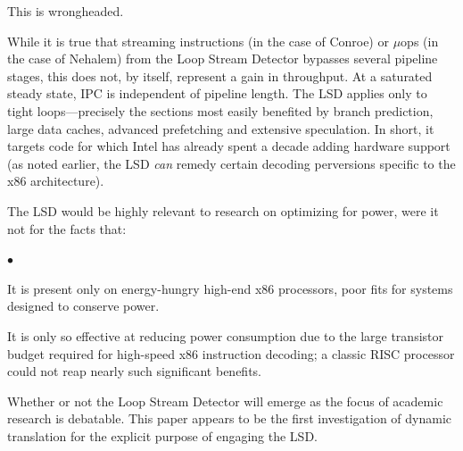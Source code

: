\documentclass[]{sigplanconf}
\newcommand{\squishlist}{\begin{list}{$\bullet$}
  {\setlength{\itemsep}{0pt}
    \setlength{\parsep}{3pt}
    \setlength{\topsep}{3pt}
    \setlength{\partopsep}{0pt}
    \setlength{\leftmargin}{1.5em}
    \setlength{\labelwidth}{1em}
    \setlength{\labelsep}{0.5em}}}
\newcommand{\squishend}{\end{list}}
\begin{document}
This is wrongheaded.

While it is true that streaming instructions (in the case of Conroe) or $\mu$ops
(in the case of Nehalem) from the Loop Stream Detector bypasses several pipeline stages,
this does not, by itself, represent a gain in throughput. At a saturated steady
state, IPC is independent of pipeline length. The LSD applies only to tight
loops---precisely the sections most easily benefited by branch prediction,
large data caches, advanced prefetching and extensive speculation. In short,
it targets code for which Intel has already spent a decade adding hardware
support (as noted earlier, the LSD \textit{can} remedy certain decoding
perversions specific to the x86 architecture).

The LSD would be highly relevant to research on optimizing for power, were it
not for the facts that:
\squishlist
\item It is present only on energy-hungry high-end x86 processors, poor fits for
systems designed to conserve power.
\item It is only so effective at reducing power consumption due to the large
transistor budget required for high-speed x86 instruction decoding; a classic
RISC processor could not reap nearly such significant benefits.
\squishend
Whether or not the Loop Stream Detector will emerge as the focus of academic
research is debatable. This paper appears to be the first investigation
of dynamic translation for the explicit purpose of engaging the LSD.
\appendix



\end{document}
